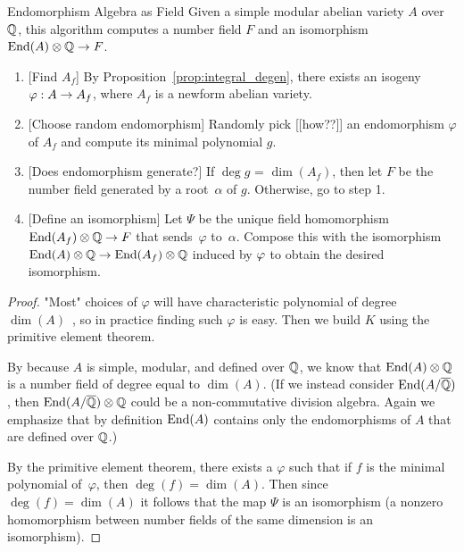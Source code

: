 \documentclass{article}
\begin{document}
\begin{algorithm}{Endomorphism Algebra as Field}
    \label{alg:end_as_field}
    Given a simple modular abelian variety $A$ over $\mathbb{Q}$,
    this algorithm computes a number field $F$ and an
    isomorphism $\operatorname{End}(A)\otimes\mathbb{Q} \to F$.
    \begin{enumerate}

        \item{} [Find $A_f$] By Proposition~\ref{prop:integral_degen}, there
            exists an isogeny $\varphi:A\to A_f$, where $A_f$ is a newform
            abelian variety.  
        \item{} [Choose random endomorphism] Randomly pick [[how??]] an endomorphism
            $\varphi$ of $A_f$ and compute its minimal polynomial $g$.
        \item{} [Does endomorphism generate?]
            If $\deg g$ = $\dim(A_f)$, then let $F$ be the
            number field generated by a root~$\alpha$ of $g$.
            Otherwise, go to step 1.
        \item{} [Define an isomorphism] Let $\Psi$ be the unique field
            homomorphism $\operatorname{End}(A_f)\otimes\mathbb{Q} \to F$ that sends~$\varphi$
            to~$\alpha$.  Compose this with the isomorphism
            $\operatorname{End}(A)\otimes\mathbb{Q} \to \operatorname{End}(A_f)\otimes\mathbb{Q}$ induced by $\varphi$
            to obtain the desired isomorphism.

    \end{enumerate}
\end{algorithm}
\begin{proof}
    "Most" choices of $\varphi$ will have characteristic polynomial of degree
    $\dim(A)$~\cite{primitive_element}, so in practice finding such $\varphi$
    is easy. Then we build $K$ using the primitive element theorem.

    By \cite[Theorem 2.1]{ribet:abvars} because $A$ is simple, modular, and
    defined over $\mathbb{Q}$, we know that $\operatorname{End}(A)\otimes\mathbb{Q}$ is a number field of
    degree equal to $\dim(A)$.  (If we instead consider $\operatorname{End}(A/\overline{\mathbb{Q}})$, then
    $\operatorname{End}(A/\overline{\mathbb{Q}})\otimes\mathbb{Q}$ could be a non-commutative division algebra.
    Again we emphasize that by definition $\operatorname{End}(A)$ contains only the
    endomorphisms of $A$ that are defined over $\mathbb{Q}$.)

    By the primitive element theorem, there exists a $\varphi$ such that
    if $f$ is the minimal polynomial of~$\varphi$, then
    $\deg(f) = \dim(A)$.
    Then since $\deg(f) = \dim(A)$ it follows that the
    map $\Psi$ is an isomorphism (a nonzero homomorphism between number
    fields of the same dimension is an isomorphism).
\end{proof}
\end{document}
